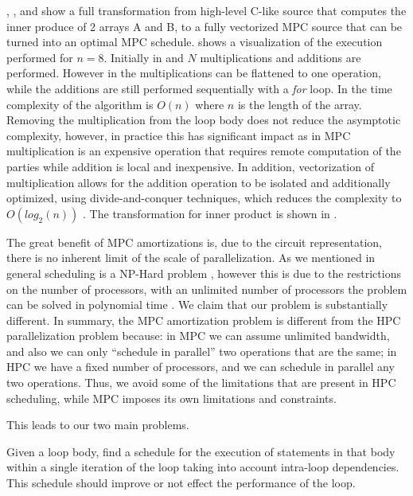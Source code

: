, , and  
show a full transformation from high-level C-like source that computes the inner produce of 2 arrays {\sf A} and {\sf B}, 
to a fully vectorized MPC source that can be turned into an optimal MPC schedule. 
shows a visualization of the execution performed for $n = 8$.
Initially in  and  $N$ 
multiplications and additions are performed. However in  
the multiplications can be flattened to one operation, while the
additions are still performed sequentially with a \emph{for} loop. In   the time
complexity of the algorithm is $O(n)$ where $n$ is the length of the array. Removing
the multiplication from the loop body does not reduce the asymptotic complexity, however,
in practice this has significant impact as in MPC multiplication is an expensive operation that
requires remote computation of the parties while addition is local and inexpensive. 
In addition, vectorization of multiplication allows for the addition operation to be isolated and 
additionally optimized, using divide-and-conquer techniques, which reduces the complexity to
$O(log_2(n))$ \cite{Farzan2017}. The transformation for inner product is shown in .

The great benefit of MPC amortizations is, due to the circuit representation, there is no inherent 
limit of the scale of parallelization. As we mentioned in  general
scheduling is a NP-Hard problem \cite{Cytron1984},\cite{Graham1971} however this is due to the restrictions
on the number of processors, with an unlimited number of processors the problem can be solved in polynomial time
\cite{Darte2000}. We claim that our problem is substantially different. In summary, the MPC amortization problem 
is different from the HPC parallelization problem because: in MPC we can assume unlimited bandwidth, and also 
we can only ``schedule in parallel'' two operations that are the same; in HPC we have a fixed number of processors, 
and we can schedule in parallel any two operations. Thus, we avoid some of the limitations that are present in HPC 
scheduling, while MPC imposes its own limitations and constraints. 


This leads to our two main problems. 

\begin{problem}
Given a loop body, find a schedule for the execution of statements in that body within a single iteration
of the loop taking into account intra-loop dependencies. This schedule should improve or not effect the
performance of the loop.
\label{problem:prob1}
\end{problem}

